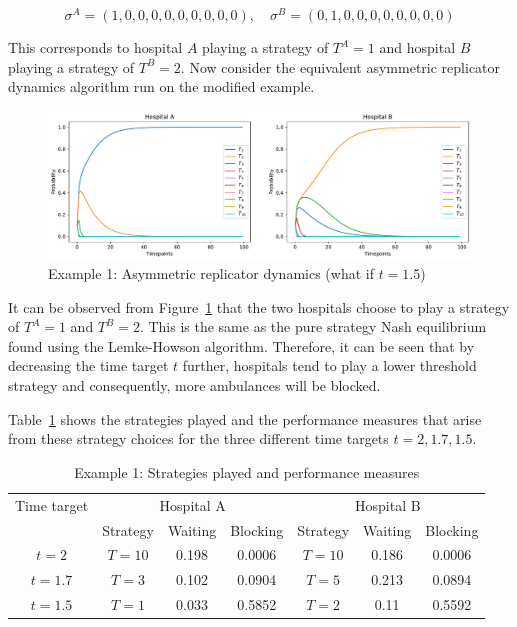 \begin{equation}
    \sigma^A = (1, 0, 0, 0, 0, 0, 0, 0, 0, 0), \quad
    \sigma^B = (0, 1, 0, 0, 0, 0, 0, 0, 0, 0)
\end{equation}

This corresponds to hospital \(A\) playing a strategy of \(T^A = 1\) and
hospital \(B\) playing a strategy of \(T^B = 2\).
Now consider the equivalent asymmetric replicator dynamics algorithm run on
the modified example.

\begin{figure}[H]
    \centering
    \includegraphics[width=\linewidth]{chapters/05_numerical_results/Bin/example_1/what_if_t_1.5.pdf}
    \caption{Example 1: Asymmetric replicator dynamics (what if \(t = 1.5\))}
    \label{fig:asymmetric_replicator_dynamics_example_1_what_if_2}
\end{figure}

It can be observed from
Figure~\ref{fig:asymmetric_replicator_dynamics_example_1_what_if_2} that the
two hospitals choose to play a strategy of \(T^A = 1\) and \(T^B = 2\).
This is the same as the pure strategy Nash equilibrium found using the
Lemke-Howson algorithm.
Therefore, it can be seen that by decreasing the time target \(t\) further,
hospitals tend to play a lower threshold strategy and consequently, more
ambulances will be blocked.

Table~\ref{tab:example_1_strategies_played_and_performance_measures} shows the
strategies played and the performance measures that arise from these strategy
choices for the three different time targets \(t = 2, 1.7, 1.5\).

\begin{table}[H]
    \centering
    \caption{Example 1: Strategies played and performance measures}
    \begin{tabular}{|c|ccc|ccc|}
        \hline
        Time target & \multicolumn{3}{c|}{Hospital A} &
        \multicolumn{3}{c|}{Hospital B} \\
        & Strategy & Waiting & Blocking & Strategy & Waiting & Blocking \\
        \hline
        \(t = 2\) & \(T = 10\) & 0.198 & 0.0006 & \(T = 10\) & 0.186 & 0.0006 \\
        \(t = 1.7\) & \(T = 3\) & 0.102 & 0.0904 & \(T = 5\) & 0.213 & 0.0894 \\
        \(t = 1.5\) & \(T = 1\) & 0.033 & 0.5852 & \(T = 2\) & 0.11 & 0.5592 \\
        \hline
    \end{tabular}
    \label{tab:example_1_strategies_played_and_performance_measures}
\end{table}

